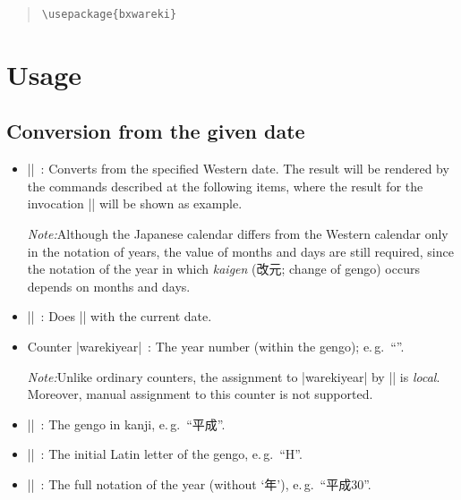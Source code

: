 \documentclass[a4paper]{article}
\newcommand{\Meta}[1]{$\langle$\textit{#1}$\rangle$}
\newcommand{\Note}{\par\noindent\emph{Note:}\quad}
\newcommand{\Eg}{e.\,g.}
\newcommand{\Means}{~:\quad}
\newcommand*{\Ja}[1]{{\fIpaex#1}}
\newcommand*{\+}{\hspace{0.25em minus 0.25em}}
\begin{document}
\begin{quote}\small\begin{verbatim}
\usepackage{bxwareki}
\end{verbatim}\end{quote}

\section{Usage}
\label{sec:Usage}

\subsection{Conversion from the given date}

\begin{itemize}
\item |\warekisetdate{|\Meta{year}|}{|\Meta{month}|}{|\Meta{day}|}|\Means
  Converts from the specified Western date.
  The result will be rendered by the commands described
  at the following items, where the result for the invocation
  ||
  will be shown as example.

  \Note Although the Japanese calendar differs from the Western calendar
  only in the notation of years,
  the value of months and days are still required,
  since the notation of the year in which
  \emph{kaigen} (\Ja{改元}; change of gengo)
  occurs depends on months and days.

\item |\warekisettoday|\Means
  Does |\warekisetdate| with the current date.

\item Counter |warekiyear|\Means
  The year number (within the gengo); \Eg~``\Ja{30}''.

  \Note Unlike ordinary counters,
  the assignment to |warekiyear| by |\warekisetdate| is \emph{local}.
  Moreover, manual assignment to this counter is not supported.

\item |\warekigengo|\Means
  The gengo in kanji, \Eg~``\Ja{平成}''.

\item |\warekigengoinitial|\Means
  The initial Latin letter of the gengo, \Eg~``\Ja{H}''.

\item |\warekiyear|\Means
  The full notation of the year (without `\Ja{年}'),
  \Eg~``\Ja{平成\+30}''.


\end{itemize}
\end{document}
